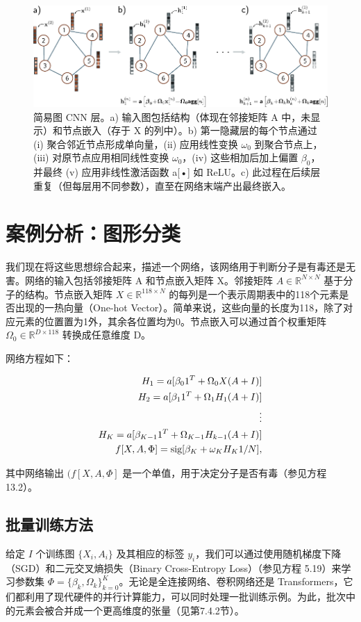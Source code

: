 \documentclass[lang=cn,newtx,10pt,scheme=chinese]{elegantbook}
\begin{document}
\begin{figure}[ht!]
\centering
\includegraphics[width=0.7\linewidth]{PDFFigures/UDLChap13PDF/GraphGCN.pdf}
\caption{简易图 CNN 层。a) 输入图包括结构（体现在邻接矩阵 A 中，未显示）和节点嵌入（存于 X 的列中）。b) 第一隐藏层的每个节点通过 (i) 聚合邻近节点形成单向量，(ii) 应用线性变换 \(\omega_0\) 到聚合节点上，(iii) 对原节点应用相同线性变换 \(\omega_0\)，(iv) 这些相加后加上偏置 \(\beta_0\)，并最终 (v) 应用非线性激活函数 a[•] 如 ReLU。c) 此过程在后续层重复（但每层用不同参数），直至在网络末端产出最终嵌入。}
\end{figure}


\section{案例分析：图形分类}
我们现在将这些思想综合起来，描述一个网络，该网络用于判断分子是有毒还是无害。网络的输入包括邻接矩阵 A 和节点嵌入矩阵 X。邻接矩阵 \(A \in \mathbb{R}^{N \times N}\) 基于分子的结构。节点嵌入矩阵 \(X \in \mathbb{R}^{118 \times N}\) 的每列是一个表示周期表中的118个元素是否出现的一热向量（One-hot Vector）。简单来说，这些向量的长度为118，除了对应元素的位置置为1外，其余各位置均为0。节点嵌入可以通过首个权重矩阵  \(\Omega_0 \in \mathbb{R}^{D \times 118}\) 转换成任意维度 D。

网络方程如下：


\begin{align}
H_1 = a[\beta_0 1^T + \Omega_0 X(A + I)] \notag \\
H_2 = a[\beta_1 1^T + \Omega_1 H_1(A + I)] \notag \\
\vdots \notag \\
H_K = a[\beta_{K-1} 1^T + \Omega_{K-1} H_{k-1}(A + I)] \notag \\
f[X, A, \Phi] = \text{sig}[\beta_K + \omega_K H_K 1/N], 
\end{align} 


其中网络输出 \((f[X, A, \Phi]\) 是一个单值，用于决定分子是否有毒（参见方程 13.2）。
\subsection{批量训练方法}
给定 \(I\) 个训练图 \(\{X_i, A_i\}\) 及其相应的标签 \(y_i\)，我们可以通过使用随机梯度下降（SGD）和二元交叉熵损失（Binary Cross-Entropy Loss）（参见方程 5.19）来学习参数集 \(\Phi = \{\beta_k, \Omega_k\}^K_{k=0}\)。无论是全连接网络、卷积网络还是 Transformers，它们都利用了现代硬件的并行计算能力，可以同时处理一批训练示例。为此，批次中的元素会被合并成一个更高维度的张量（见第7.4.2节）。
\end{document}
